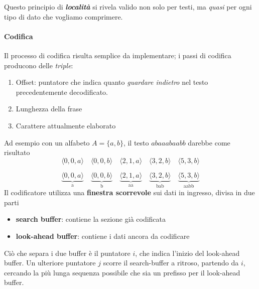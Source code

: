 Questo principio di \textbf{\textit{località}} si rivela valido non solo per testi, ma \textit{quasi} per ogni tipo di dato che vogliamo comprimere.


\paragraph{Codifica}
Il processo di codifica risulta semplice da implementare; i passi di codifica producono delle \textit{triple}:
\begin{enumerate}
    \item Offset: puntatore che indica quanto \textit{guardare indietro} nel testo precedentemente decodificato.
    \item Lunghezza della frase
    \item Carattere attualmente elaborato
\end{enumerate}
Ad esempio con un alfabeto $A = \{a,b\}$, il testo $abaaabaabb$ darebbe come risultato
\[\langle 0,0,a \rangle \quad \langle 0,0,b \rangle \quad \langle 2,1,a \rangle \quad \langle 3,2,b \rangle \quad \langle 5,3,b \rangle\]

\[
\underbrace{\langle 0,0,a \rangle}_{\text{a}} \quad
\underbrace{\langle 0,0,b \rangle}_{\text{b}} \quad
\underbrace{\langle 2,1,a \rangle}_{\text{aa}} \quad
\underbrace{\langle 3,2,b \rangle}_{\text{bab}} \quad
\underbrace{\langle 5,3,b \rangle}_{\text{aabb}}
\]
Il codificatore utilizza una \textbf{finestra scorrevole} sui dati in ingresso, divisa in due parti
\begin{itemize}
    \item \textbf{search buffer}: contiene la sezione già codificata
    \item \textbf{look-ahead buffer}: contiene i dati ancora da codificare
\end{itemize}
Ciò che separa i due buffer è il puntatore $i$, che indica l'inizio del look-ahead buffer.
Un ulteriore puntatore $j$ scorre il search-buffer a ritroso, partendo da $i$, cercando la più lunga sequenza possibile che sia un prefisso per il look-ahead buffer.

